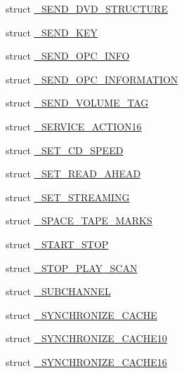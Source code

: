 \begin{DoxyCompactItemize}
struct \hyperlink{struct___c_d_b_1_1___s_e_n_d___d_v_d___s_t_r_u_c_t_u_r_e}{\+\_\+\+S\+E\+N\+D\+\_\+\+D\+V\+D\+\_\+\+S\+T\+R\+U\+C\+T\+U\+RE}
\item 
struct \hyperlink{struct___c_d_b_1_1___s_e_n_d___k_e_y}{\+\_\+\+S\+E\+N\+D\+\_\+\+K\+EY}
\item 
struct \hyperlink{struct___c_d_b_1_1___s_e_n_d___o_p_c___i_n_f_o}{\+\_\+\+S\+E\+N\+D\+\_\+\+O\+P\+C\+\_\+\+I\+N\+FO}
\item 
struct \hyperlink{struct___c_d_b_1_1___s_e_n_d___o_p_c___i_n_f_o_r_m_a_t_i_o_n}{\+\_\+\+S\+E\+N\+D\+\_\+\+O\+P\+C\+\_\+\+I\+N\+F\+O\+R\+M\+A\+T\+I\+ON}
\item 
struct \hyperlink{struct___c_d_b_1_1___s_e_n_d___v_o_l_u_m_e___t_a_g}{\+\_\+\+S\+E\+N\+D\+\_\+\+V\+O\+L\+U\+M\+E\+\_\+\+T\+AG}
\item 
struct \hyperlink{struct___c_d_b_1_1___s_e_r_v_i_c_e___a_c_t_i_o_n16}{\+\_\+\+S\+E\+R\+V\+I\+C\+E\+\_\+\+A\+C\+T\+I\+O\+N16}
\item 
struct \hyperlink{struct___c_d_b_1_1___s_e_t___c_d___s_p_e_e_d}{\+\_\+\+S\+E\+T\+\_\+\+C\+D\+\_\+\+S\+P\+E\+ED}
\item 
struct \hyperlink{struct___c_d_b_1_1___s_e_t___r_e_a_d___a_h_e_a_d}{\+\_\+\+S\+E\+T\+\_\+\+R\+E\+A\+D\+\_\+\+A\+H\+E\+AD}
\item 
struct \hyperlink{struct___c_d_b_1_1___s_e_t___s_t_r_e_a_m_i_n_g}{\+\_\+\+S\+E\+T\+\_\+\+S\+T\+R\+E\+A\+M\+I\+NG}
\item 
struct \hyperlink{struct___c_d_b_1_1___s_p_a_c_e___t_a_p_e___m_a_r_k_s}{\+\_\+\+S\+P\+A\+C\+E\+\_\+\+T\+A\+P\+E\+\_\+\+M\+A\+R\+KS}
\item 
struct \hyperlink{struct___c_d_b_1_1___s_t_a_r_t___s_t_o_p}{\+\_\+\+S\+T\+A\+R\+T\+\_\+\+S\+T\+OP}
\item 
struct \hyperlink{struct___c_d_b_1_1___s_t_o_p___p_l_a_y___s_c_a_n}{\+\_\+\+S\+T\+O\+P\+\_\+\+P\+L\+A\+Y\+\_\+\+S\+C\+AN}
\item 
struct \hyperlink{struct___c_d_b_1_1___s_u_b_c_h_a_n_n_e_l}{\+\_\+\+S\+U\+B\+C\+H\+A\+N\+N\+EL}
\item 
struct \hyperlink{struct___c_d_b_1_1___s_y_n_c_h_r_o_n_i_z_e___c_a_c_h_e}{\+\_\+\+S\+Y\+N\+C\+H\+R\+O\+N\+I\+Z\+E\+\_\+\+C\+A\+C\+HE}
\item 
struct \hyperlink{struct___c_d_b_1_1___s_y_n_c_h_r_o_n_i_z_e___c_a_c_h_e10}{\+\_\+\+S\+Y\+N\+C\+H\+R\+O\+N\+I\+Z\+E\+\_\+\+C\+A\+C\+H\+E10}
\item 
struct \hyperlink{struct___c_d_b_1_1___s_y_n_c_h_r_o_n_i_z_e___c_a_c_h_e16}{\+\_\+\+S\+Y\+N\+C\+H\+R\+O\+N\+I\+Z\+E\+\_\+\+C\+A\+C\+H\+E16}

\end{DoxyCompactItemize}
